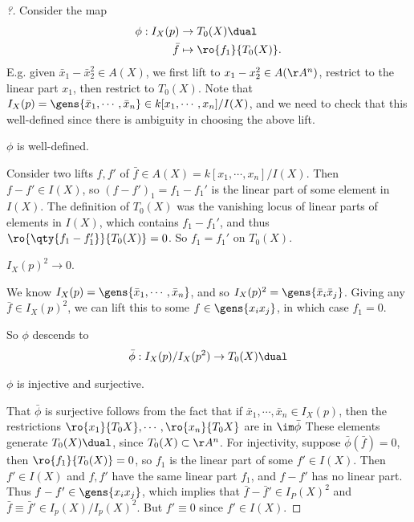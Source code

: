\begin{proof}[?]

Consider the map
\begin{align*}  
\phi: I_X(p) &\to T_0(X)\dual \\
\bar f &\mapsto \ro{f_1}{T_0(X)}
.\end{align*} E.g. given \(\bar x_1 - \bar x_2^2 \in A(X)\), we first
lift to \(x_1 - x_2^2 \in A(\AA^n)\), restrict to the linear part
\(x_1\), then restrict to \(T_0(X)\). Note that
\(I_X(p) = \gens{\bar x_1, \cdots, \bar x_n} \in k[x_1, \cdots, x_n]/I(X)\),
and we need to check that this well-defined since there is ambiguity in
choosing the above lift.

\begin{claim}

\(\phi\) is well-defined.

\end{claim}

Consider two lifts \(f, f'\) of
\(\bar f\in A(X) = k[x_1, \cdots, x_n]/I(X)\). Then \(f - f'\in I(X)\),
so \((f - f')_1 = f_1 - f_1'\) is the linear part of some element in
\(I(X)\). The definition of \(T_0(X)\) was the vanishing locus of linear
parts of elements in \(I(X)\), which contains \(f_1 - f_1'\), and thus
\(\ro{\qty{f_1 - f_1'} }{T_0(X)} = 0\). So \(f_1 = f_1'\) on \(T_0(X)\).

\begin{claim}

\(I_X(p)^2 \to 0\).

\end{claim}

We know \(I_X(p) = \gens{\bar x_1, \cdots, \bar x_n}\), and so
\(I_X(p)^2 = \gens{\bar x_i \bar x_j}\). Giving any
\(\bar f\in I_X(p)^2\), we can lift this to some
\(f\in \gens{x_i x_j}\), in which case \(f_1 = 0\).

So \(\phi\) descends to
\begin{align*}
\bar \phi: I_X(p) / I_X(p^2) &\to T_0(X)\dual \\
\end{align*}

\begin{claim}

\(\phi\) is injective and surjective.

\end{claim}

That \(\bar \phi\) is surjective follows from the fact that if
\(\bar x_1, \cdots, \bar x_n \in I_X(p)\), then the restrictions
\(\ro{x_1}{T_0X}, \cdots, \ro{x_n}{T_0X}\) are in \(\im \bar \phi\)
These elements generate \(T_0(X)\dual\), since \(T_0(X) \subset\AA^n\).
For injectivity, suppose \(\bar \phi(\bar f) = 0\), then
\(\ro{f_1}{T_0(X)} = 0\), so \(f_1\) is the linear part of some
\(f' \in I(X)\). Then \(f' \in I(X)\) and \(f, f'\) have the same linear
part \(f_1\), and \(f-f'\) has no linear part. Thus
\(f-f'\in \gens{x_i x_j}\), which implies that
\(\bar f - \bar f' \in I_P(X)^2\) and
\(\bar f \equiv \bar f' \in I_p(X) / I_p(X)^2\). But \(f' \equiv 0\)
since \(f'\in I(X)\).

\end{proof}

